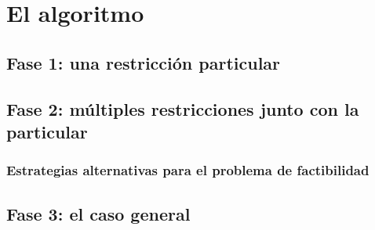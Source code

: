 \chapter{El algoritmo}

\section{Fase 1: una restricción particular}

\section{Fase 2: múltiples restricciones junto con la particular}
\subsection{Estrategias alternativas para el problema de factibilidad}

\section{Fase 3: el caso general}
